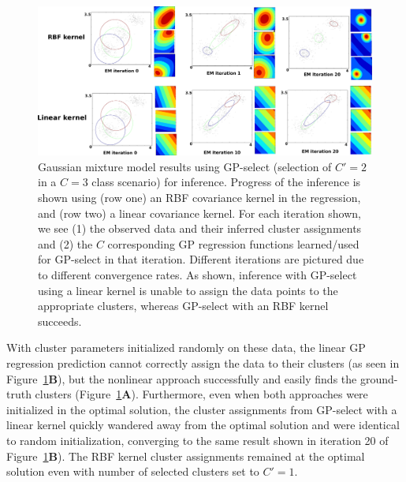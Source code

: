 \begin{figure}[t]
\begin{center}
\includegraphics[width=1\textwidth]{mog/mog_labels2.pdf}%
\caption{Gaussian mixture model results using GP-select (selection of $C'=2$ in a $C=3$ class scenario) for inference.
Progress of the inference is shown using (row one) an RBF covariance kernel in the regression, and (row two) a linear covariance kernel.
For each iteration shown, we see (1) the observed data and their inferred cluster assignments and (2) the $C$ corresponding GP regression functions learned/used for GP-select in that iteration. Different iterations are pictured due to different convergence rates. As shown, inference with GP-select using a linear kernel is unable to assign the data points to the appropriate clusters, whereas GP-select with an RBF kernel succeeds.}\label{fig:mog}%
\end{center}
\end{figure}

With cluster parameters initialized randomly on these data, the linear GP regression prediction cannot correctly assign the data to their clusters (as seen in Figure~\ref{fig:mog}\textbf{B}), but the nonlinear approach successfully and easily finds the ground-truth clusters (Figure~\ref{fig:mog}\textbf{A}).
Furthermore, even when both approaches were initialized in the optimal solution, the cluster assignments from GP-select with a linear kernel quickly wandered away from the optimal solution and were identical to random initialization, converging to the same result shown in iteration 20 of Figure~\ref{fig:mog}\textbf{B}).
The RBF kernel cluster assignments remained at the optimal solution even with number of selected clusters set to $C'=1$.

